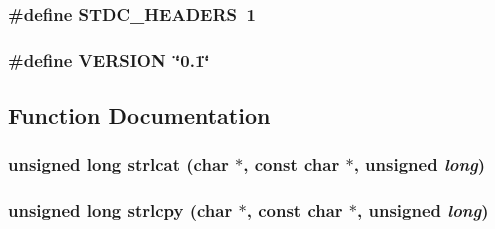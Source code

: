\subsubsection{\setlength{\rightskip}{0pt plus 5cm}\#define STDC\_\-HEADERS~1}\label{config_8h_0829df2ab5dceecd32cfbeee3082f743}


\subsubsection{\setlength{\rightskip}{0pt plus 5cm}\#define VERSION~\char`\"{}0.1\char`\"{}}\label{config_8h_021321e8c168ba3ae39ce3a2e7b3ec87}




\subsection{Function Documentation}
\subsubsection{\setlength{\rightskip}{0pt plus 5cm}unsigned long strlcat (char $\ast$, const char $\ast$, unsigned {\em long})}\label{config_8h_2e76b28ab2e0c76378c5e622ceda6fcf}


\subsubsection{\setlength{\rightskip}{0pt plus 5cm}unsigned long strlcpy (char $\ast$, const char $\ast$, unsigned {\em long})}\label{config_8h_4307ad95cb858c82897600d54d024406}


